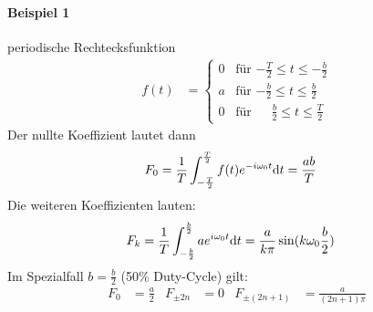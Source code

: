 \paragraph{Beispiel 1} periodische Rechtecksfunktion
\begin{align*}
  f(t)&=\left\{
        \begin{array}{ll}
          0&\text{für $-\frac{T}{2}\leq t\leq -\frac{b}{2}$}\\
          a&\text{für $-\frac{b}{2}\leq t\leq \frac{b}{2}$}\\
          0&\text{für $\phantom{-}\frac{b}{2}\leq t\leq \frac{T}{2}$}
        \end{array}
             \right.
\end{align*}
Der nullte Koeffizient lautet dann
\begin{align*}
  F_0 &= \frac{1}{T} \int_{-\frac{T}{2}}^{\frac{T}{2}}
        f(t)e^{-i\omega_0 t}\mathrm{d} t
        = \frac{ab}{T}
\end{align*}
Die weiteren Koeffizienten lauten:
\begin{align*}
  F_k &= \frac{1}{T} \int_{-\frac{b}{2}}^{\frac{b}{2}} 
        ae^{i\omega_0 t}\mathrm{d} t
        = \frac{a}{k\pi}\sin(k\omega_0\frac{b}{2})
\end{align*}
Im Spezialfall $b=\frac{b}{2}$ (50\% Duty-Cycle) gilt:
\begin{align*}
  F_0 &= \frac{a}{2}
  &F_{\pm 2n} &= 0
  &F_{\pm (2n+1)} &= \frac{a}{(2n+1)\pi}
\end{align*}


